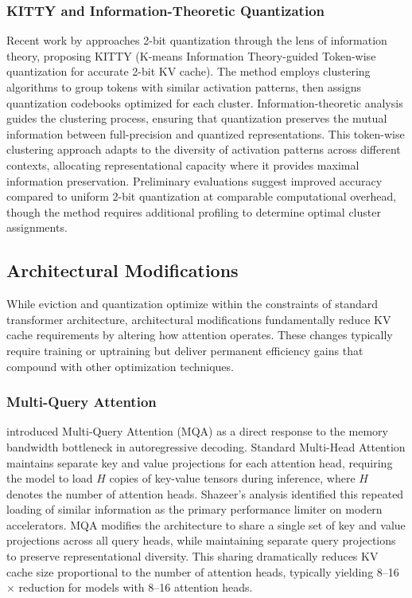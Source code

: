 \documentclass[11pt,letterpaper]{article}
\begin{document}
\subsubsection{KITTY and Information-Theoretic Quantization}

Recent work by \cite{yuan2024kitty} approaches 2-bit quantization through the lens of information theory, proposing KITTY (K-means Information Theory-guided Token-wise quantization for accurate 2-bit KV cache). The method employs clustering algorithms to group tokens with similar activation patterns, then assigns quantization codebooks optimized for each cluster. Information-theoretic analysis guides the clustering process, ensuring that quantization preserves the mutual information between full-precision and quantized representations. This token-wise clustering approach adapts to the diversity of activation patterns across different contexts, allocating representational capacity where it provides maximal information preservation. Preliminary evaluations suggest improved accuracy compared to uniform 2-bit quantization at comparable computational overhead, though the method requires additional profiling to determine optimal cluster assignments.

\subsection{Architectural Modifications}

While eviction and quantization optimize within the constraints of standard transformer architecture, architectural modifications fundamentally reduce KV cache requirements by altering how attention operates. These changes typically require training or uptraining but deliver permanent efficiency gains that compound with other optimization techniques.

\subsubsection{Multi-Query Attention}

\cite{shazeer2019fast} introduced Multi-Query Attention (MQA) as a direct response to the memory bandwidth bottleneck in autoregressive decoding. Standard Multi-Head Attention maintains separate key and value projections for each attention head, requiring the model to load $H$ copies of key-value tensors during inference, where $H$ denotes the number of attention heads. Shazeer's analysis identified this repeated loading of similar information as the primary performance limiter on modern accelerators. MQA modifies the architecture to share a single set of key and value projections across all query heads, while maintaining separate query projections to preserve representational diversity. This sharing dramatically reduces KV cache size proportional to the number of attention heads, typically yielding 8--16$\times$ reduction for models with 8--16 attention heads.
\end{document}
